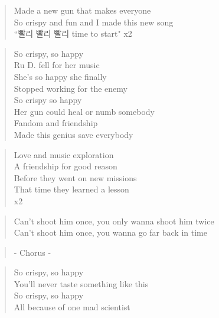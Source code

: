 \begin{verse}
Made a new gun that makes everyone\\
So crispy and fun and I made this new song\\
``빨리 \ks 빨리 \ks 빨리 \ks time to start" x2
\end{verse}

\begin{verse}
So crispy, so happy\\
Ru D. fell for her music \\
She's so happy she finally\\
Stopped working for the enemy\\
So crispy so happy\\
Her gun could heal or numb somebody\\
Fandom and friendship\\
Made this genius save everybody
\end{verse}

\begin{verse}
Love and music exploration\\
A friendship for good reason\\
Before they went on new missions\\
That time they learned a lesson\\
x2
\end{verse}

\begin{verse}
Can't shoot him once, you only wanna shoot him twice\\
Can't shoot him once, you wanna go far back in time
\end{verse}

\begin{verse}
- Chorus -
\end{verse}

\begin{verse}
So crispy, so happy\\
You'll never taste something like this\\
So crispy, so happy\\
All because of one mad scientist
\end{verse}

\clearpage
